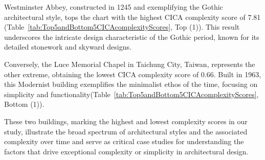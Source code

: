 Westminster Abbey, constructed in 1245 and exemplifying the Gothic architectural style, tops the chart with the highest CICA complexity score of 7.81 (Table~\ref{tab:Top5andBottom5CICAcomplexityScores}, Top (1)).
This result underscores the intricate design characteristic of the Gothic period, known for its detailed stonework and skyward designs\cite{Stacbond2020}.

Conversely, the Luce Memorial Chapel in Taichung City, Taiwan, represents the other extreme, obtaining the lowest CICA complexity score of 0.66.
Built in 1963, this Modernist building exemplifies the minimalist ethos of the time, focusing on simplicity and functionality(Table~\ref{tab:Top5andBottom5CICAcomplexityScores}, Bottom (1)).

These two buildings, marking the highest and lowest complexity scores in our study, illustrate the broad spectrum of architectural styles and the associated complexity over time and serve as critical case studies for understanding the factors that drive exceptional complexity or simplicity in architectural design.



%



